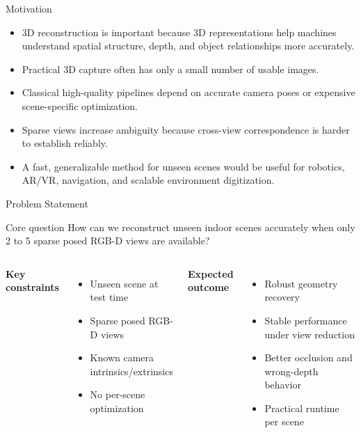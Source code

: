 \begin{frame}{Motivation}
  \begin{itemize}
    \item 3D reconstruction is important because 3D representations help
    machines understand spatial structure, depth, and object relationships more
    accurately.
    \item Practical 3D capture often has only a small number of usable images.
    \item Classical high-quality pipelines depend on accurate camera poses or
    expensive scene-specific optimization.
    \item Sparse views increase ambiguity because cross-view correspondence is
    harder to establish reliably.
    \item A fast, generalizable method for unseen scenes would be useful for
    robotics, AR/VR, navigation, and scalable environment digitization.
  \end{itemize}
\end{frame}

\begin{frame}{Problem Statement}
  \begin{block}{Core question}
    How can we reconstruct unseen indoor scenes accurately when only 2 to 5
    sparse posed RGB-D views are available?
  \end{block}

  \vspace{0.3cm}
  \begin{columns}[T]
    \textbf{Key constraints}
    \begin{itemize}
      \item Unseen scene at test time
      \item Sparse posed RGB-D views
      \item Known camera intrinsics/extrinsics
      \item No per-scene optimization
    \end{itemize}

    \textbf{Expected outcome}
    \begin{itemize}
      \item Robust geometry recovery
      \item Stable performance under view reduction
      \item Better occlusion and wrong-depth behavior
      \item Practical runtime per scene
    \end{itemize}
  \end{columns}
\end{frame}
